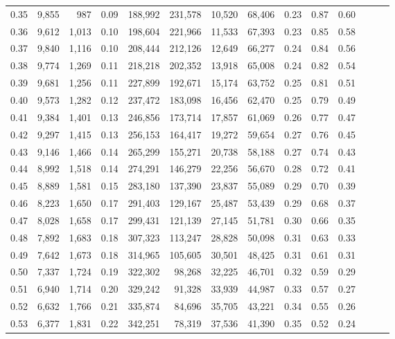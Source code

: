 \begin{tabular}{rrrrrrrrrrrrrr}
0.35 &  9,855 &    987 &  0.09 &  188,992 &  231,578 &  10,520 &  68,406 &  0.23 &  0.87 &      0.60 \\
0.36 &  9,612 &  1,013 &  0.10 &  198,604 &  221,966 &  11,533 &  67,393 &  0.23 &  0.85 &      0.58 \\
0.37 &  9,840 &  1,116 &  0.10 &  208,444 &  212,126 &  12,649 &  66,277 &  0.24 &  0.84 &      0.56 \\
0.38 &  9,774 &  1,269 &  0.11 &  218,218 &  202,352 &  13,918 &  65,008 &  0.24 &  0.82 &      0.54 \\
0.39 &  9,681 &  1,256 &  0.11 &  227,899 &  192,671 &  15,174 &  63,752 &  0.25 &  0.81 &      0.51 \\
0.40 &  9,573 &  1,282 &  0.12 &  237,472 &  183,098 &  16,456 &  62,470 &  0.25 &  0.79 &      0.49 \\
0.41 &  9,384 &  1,401 &  0.13 &  246,856 &  173,714 &  17,857 &  61,069 &  0.26 &  0.77 &      0.47 \\
0.42 &  9,297 &  1,415 &  0.13 &  256,153 &  164,417 &  19,272 &  59,654 &  0.27 &  0.76 &      0.45 \\
0.43 &  9,146 &  1,466 &  0.14 &  265,299 &  155,271 &  20,738 &  58,188 &  0.27 &  0.74 &      0.43 \\
0.44 &  8,992 &  1,518 &  0.14 &  274,291 &  146,279 &  22,256 &  56,670 &  0.28 &  0.72 &      0.41 \\
0.45 &  8,889 &  1,581 &  0.15 &  283,180 &  137,390 &  23,837 &  55,089 &  0.29 &  0.70 &      0.39 \\
0.46 &  8,223 &  1,650 &  0.17 &  291,403 &  129,167 &  25,487 &  53,439 &  0.29 &  0.68 &      0.37 \\
0.47 &  8,028 &  1,658 &  0.17 &  299,431 &  121,139 &  27,145 &  51,781 &  0.30 &  0.66 &      0.35 \\
0.48 &  7,892 &  1,683 &  0.18 &  307,323 &  113,247 &  28,828 &  50,098 &  0.31 &  0.63 &      0.33 \\
0.49 &  7,642 &  1,673 &  0.18 &  314,965 &  105,605 &  30,501 &  48,425 &  0.31 &  0.61 &      0.31 \\
0.50 &  7,337 &  1,724 &  0.19 &  322,302 &   98,268 &  32,225 &  46,701 &  0.32 &  0.59 &      0.29 \\
0.51 &  6,940 &  1,714 &  0.20 &  329,242 &   91,328 &  33,939 &  44,987 &  0.33 &  0.57 &      0.27 \\
0.52 &  6,632 &  1,766 &  0.21 &  335,874 &   84,696 &  35,705 &  43,221 &  0.34 &  0.55 &      0.26 \\
0.53 &  6,377 &  1,831 &  0.22 &  342,251 &   78,319 &  37,536 &  41,390 &  0.35 &  0.52 &      0.24 \\

\end{tabular}
